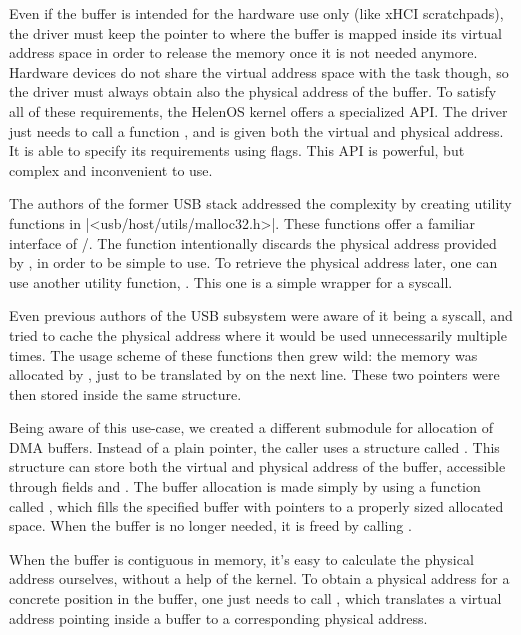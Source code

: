 Even if the buffer is intended for the hardware use only (like xHCI
scratchpads), the driver must keep the pointer to where the buffer is mapped
inside its virtual address space in order to release the memory once it is not
needed anymore. Hardware devices do not share the virtual address space with
the task though, so the driver must always obtain also the physical address of
the buffer. To satisfy all of these requirements, the HelenOS kernel offers
a specialized API. The driver just needs to call a function
, and is given both the virtual and physical address. It
is able to specify its requirements using flags. This API is powerful, but
complex and inconvenient to use.

The authors of the former USB stack addressed the complexity by creating
utility functions in \header|<usb/host/utils/malloc32.h>|. These functions offer
a familiar interface of /. The  function
intentionally discards the physical address provided by
, in order to be simple to use. To retrieve the physical
address later, one can use another utility function, . This
one is a simple wrapper for a syscall.

Even previous authors of the USB subsystem were aware of it being a syscall,
and tried to cache the physical address where it would be used unnecessarily
multiple times. The usage scheme of these functions then grew wild: the memory
was allocated by , just to be translated by  on
the next line. These two pointers were then stored inside the same structure.

Being aware of this use-case, we created a different submodule for allocation
of DMA buffers. Instead of a plain pointer, the caller uses a structure called
. This structure can store both the virtual and physical
address of the buffer, accessible through fields  and
. The buffer allocation is made simply by using a function called
, which fills the specified buffer with pointers to
a properly sized allocated space. When the buffer is no longer needed, it is
freed by calling .

When the buffer is contiguous in memory, it's easy to calculate the physical
address ourselves, without a help of the kernel. To obtain a physical address
for a concrete position in the buffer, one just needs to call
, which translates a virtual address pointing inside
a buffer to a corresponding physical address.

